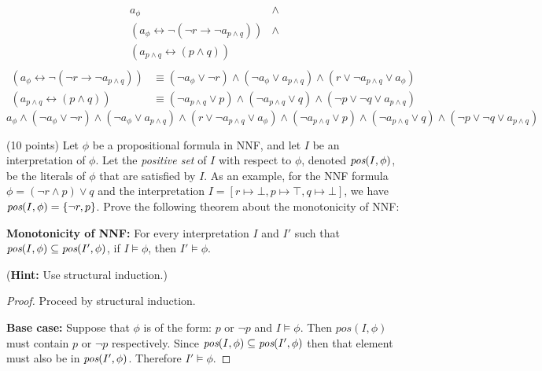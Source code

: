 \documentclass{article}
\newenvironment{solution}{\color{blue} \em }{}
\begin{document}
\begin{enumerate}
\begin{solution}
\[
\begin{array}{ll}
a_{\phi} & \land \\
( a_{\phi} \leftrightarrow \neg (\neg r \rightarrow \neg a_{p \wedge q})) & \land \\
(a_{p\wedge q} \leftrightarrow (p \wedge q)) &  \\
\end{array}
\]
\begin{align*}
    (a_{\phi} \leftrightarrow \neg (\neg r \rightarrow \neg a_{p \wedge q})) &\equiv
(\neg a_\phi \lor \neg r) \land (\neg a_\phi \lor a_{p \land q}) \land (r \lor \neg a_{p \land q} \lor a_\phi) \\
    (a_{p\wedge q} \leftrightarrow (p \wedge q)) &\equiv
    (\neg a_{p\wedge q} \lor p ) \land (\neg a_{p\land q} \lor q) \wedge (\neg p \lor \neg q \lor a_{p\wedge q}) 
\end{align*}
\[
a_\phi \land
(\neg a_\phi \lor \neg r) \land (\neg a_\phi \lor a_{p \land q}) \land (r \lor \neg a_{p \land q} \lor a_\phi) \land 
(\neg a_{p\wedge q} \lor p ) \land (\neg a_{p\land q} \lor q) \wedge (\neg p \lor \neg q \lor a_{p\wedge q}) 
\]

\end{solution}

\item (10 points)  Let $\phi$ be a propositional formula in NNF, and let $I$ be an interpretation of $\phi$. Let the \emph{positive set} of $I$ with respect to $\phi$, denoted $\emph{pos}(I, \phi)$, be the literals of $\phi$ that are satisfied by $I$. As an example, for the NNF formula $\phi = (\neg r \land p) \lor q$ and the interpretation $I = [r \mapsto \bot, p \mapsto \top, q \mapsto \bot]$, we have $\emph{pos}(I, \phi) = \{ \neg r, p \}$. Prove the following theorem about the monotonicity of NNF:

{\bf Monotonicity of NNF:} For every interpretation $I$ and $I'$ such that $\emph{pos}(I, \phi) \subseteq \emph{pos}(I', \phi)$, if $I \models \phi$, then $I' \models \phi$.

(\textbf{Hint:} Use structural induction.) \label{prob:NNF}

\begin{solution}
\begin{proof}
    Proceed by structural induction.

\item \textbf{Base case:} Suppose that $\phi$ is of the form: $p$ or $\neg p$ and $I \models \phi$. Then $pos(I, \phi)$ must contain $p$ or $\neg p$ respectively. Since $\emph{pos}(I, \phi) \subseteq \emph{pos}(I', \phi)$ then that element must also be in $\emph{pos}(I', \phi)$. Therefore $I' \models \phi$.


\end{proof}
\end{solution}
\end{enumerate}
\end{document}
